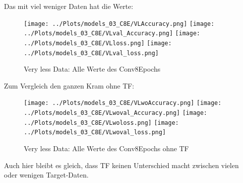     Das mit viel weniger Daten hat die Werte: 
    \begin{figure}[htpb]
        \texttt{[image: ../Plots/models\_03\_C8E/VLAccuracy.png]}
        \texttt{[image: ../Plots/models\_03\_C8E/VLval\_Accuracy.png]}
        \texttt{[image: ../Plots/models\_03\_C8E/VLloss.png]}
        \texttt{[image: ../Plots/models\_03\_C8E/VLval\_loss.png]}
        \caption{\label{fig:figure11} Very less Data: Alle Werte des Conv8Epochs}
    \end{figure}

    Zum Vergleich den ganzen Kram ohne TF: 
    \begin{figure}[htpb]
        \texttt{[image: ../Plots/models\_03\_C8E/VLwoAccuracy.png]}
        \texttt{[image: ../Plots/models\_03\_C8E/VLwoval\_Accuracy.png]}
        \texttt{[image: ../Plots/models\_03\_C8E/VLwoloss.png]}
        \texttt{[image: ../Plots/models\_03\_C8E/VLwoval\_loss.png]}
        \caption{\label{fig:figure12} Very less Data: Alle Werte des Conv8Epochs ohne TF}
    \end{figure}
    Auch hier bleibt es gleich, dass TF keinen Unterschied macht zwischen vielen oder wenigen 
    Target-Daten. 
